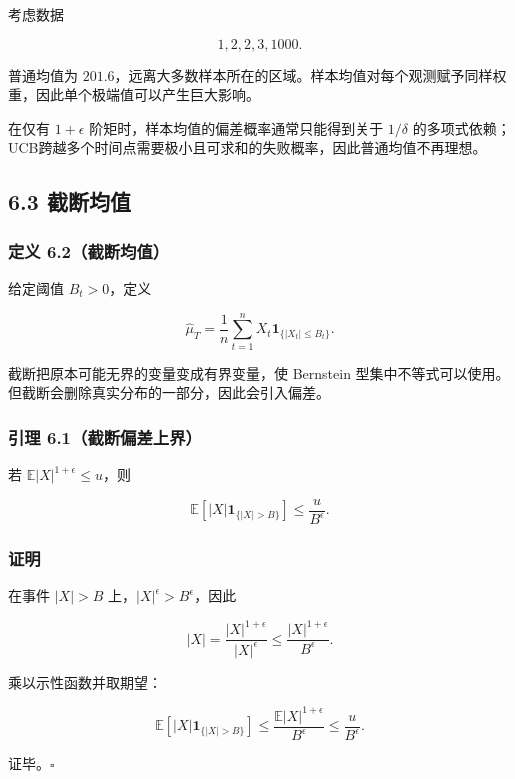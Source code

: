 \documentclass[
  11pt,
  a4paper,
]{ctexart}
\begin{document}
考虑数据

\[
1,2,2,3,1000.
\]

普通均值为
\(201.6\)，远离大多数样本所在的区域。样本均值对每个观测赋予同样权重，因此单个极端值可以产生巨大影响。

在仅有 \(1+\epsilon\) 阶矩时，样本均值的偏差概率通常只能得到关于
\(1/\delta\)
的多项式依赖；UCB跨越多个时间点需要极小且可求和的失败概率，因此普通均值不再理想。

\subsection{6.3 截断均值}\label{ux622aux65adux5747ux503c}

\subsubsection{定义
6.2（截断均值）}\label{ux5b9aux4e49-6.2ux622aux65adux5747ux503c}

给定阈值 \(B_t>0\)，定义

\[
\widehat\mu_T
=\frac1n\sum_{t=1}^nX_t\mathbf1_{\{|X_t|\le B_t\}}.
\]

截断把原本可能无界的变量变成有界变量，使 Bernstein
型集中不等式可以使用。但截断会删除真实分布的一部分，因此会引入偏差。

\subsubsection{引理
6.1（截断偏差上界）}\label{ux5f15ux7406-6.1ux622aux65adux504fux5deeux4e0aux754c}

若 \(\mathbb E|X|^{1+\epsilon}\le u\)，则

\[
\mathbb E\left[|X|\mathbf1_{\{|X|>B\}}\right]
\le\frac{u}{B^\epsilon}.
\]

\subsubsection{证明}\label{ux8bc1ux660e-7}

在事件 \(|X|>B\) 上，\(|X|^\epsilon>B^\epsilon\)，因此

\[
|X|
=\frac{|X|^{1+\epsilon}}{|X|^\epsilon}
\le\frac{|X|^{1+\epsilon}}{B^\epsilon}.
\]

乘以示性函数并取期望：

\[
\mathbb E[|X|\mathbf1_{\{|X|>B\}}]
\le\frac{\mathbb E|X|^{1+\epsilon}}{B^\epsilon}
\le\frac{u}{B^\epsilon}.
\]

证毕。\(\square\)
\end{document}
